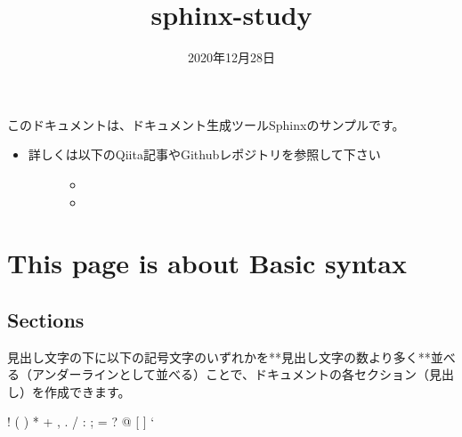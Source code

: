 \documentclass[letterpaper,10pt,dvipdfmx,openany,oneside]{sphinxmanual}
\title{sphinx-study}
\date{2020年12月28日}
\author{}
\begin{document}
\maketitle
\sphinxtableofcontents
{}\label{\detokenize{index::doc}}


このドキュメントは、ドキュメント生成ツールSphinxのサンプルです。
\begin{itemize}
\item {} \begin{description}
\item[{詳しくは以下のQiita記事やGithubレポジトリを参照して下さい}] \leavevmode\begin{itemize}
\item {} 

\item {} 

\end{itemize}

\end{description}

\end{itemize}


\chapter{This page is about Basic syntax}
\label{\detokenize{1.chapter/basic_syntax:this-page-is-about-basic-syntax}}\label{\detokenize{1.chapter/basic_syntax::doc}}\label{\detokenize{1.chapter/basic_syntax:sphinx-sample-project}}

\section{Sections}
\label{\detokenize{1.chapter/basic_syntax:sections}}
見出し文字の下に以下の記号文字のいずれかを**見出し文字の数より多く**並べる（アンダーラインとして並べる）ことで、ドキュメントの各セクション（見出し）を作成できます。

%
\begin{sphinxVerbatim}[commandchars=\\\{\}]
! \PYGZdq{} \PYGZsh{} \PYGZdl{} \PYGZpc{} \PYGZam{} \PYGZsq{} ( ) * + , \PYGZhy{} . / : ; \PYGZlt{} = \PYGZgt{} ? @ [ \PYGZbs{} ] \PYGZca{} \PYGZus{} {}` \PYGZob{} \textbar{} \PYGZcb{} \PYGZti{}
\end{sphinxVerbatim}
\end{document}
